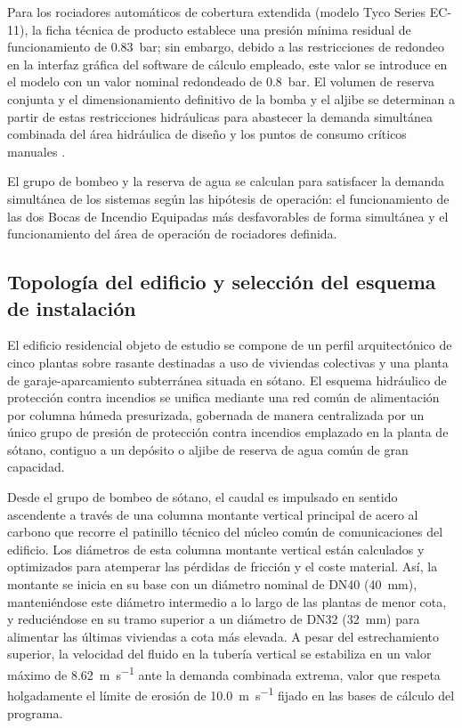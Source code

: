 \documentclass[12pt,a4paper]{article}
\begin{document}
Para los rociadores automáticos de cobertura extendida (modelo Tyco Series EC-11), la ficha técnica de producto establece una presión mínima residual de funcionamiento de \SI{0.83}{\bar}; sin embargo, debido a las restricciones de redondeo en la interfaz gráfica del software de cálculo empleado, este valor se introduce en el modelo con un valor nominal redondeado de \SI{0.8}{\bar}. El volumen de reserva conjunta y el dimensionamiento definitivo de la bomba y el aljibe se determinan a partir de estas restricciones hidráulicas para abastecer la demanda simultánea combinada del área hidráulica de diseño y los puntos de consumo críticos manuales \parencite{TYCO_EC11,UNE_EN_12845}.

El grupo de bombeo y la reserva de agua se calculan para satisfacer la demanda simultánea de los sistemas según las hipótesis de operación: el funcionamiento de las dos Bocas de Incendio Equipadas más desfavorables de forma simultánea y el funcionamiento del área de operación de rociadores definida.

\subsection{Topología del edificio y selección del esquema de instalación}

El edificio residencial objeto de estudio se compone de un perfil arquitectónico de cinco plantas sobre rasante destinadas a uso de viviendas colectivas y una planta de garaje-aparcamiento subterránea situada en sótano. El esquema hidráulico de protección contra incendios se unifica mediante una red común de alimentación por columna húmeda presurizada, gobernada de manera centralizada por un único grupo de presión de protección contra incendios emplazado en la planta de sótano, contiguo a un depósito o aljibe de reserva de agua común de gran capacidad.

Desde el grupo de bombeo de sótano, el caudal es impulsado en sentido ascendente a través de una columna montante vertical principal de acero al carbono que recorre el patinillo técnico del núcleo común de comunicaciones del edificio. Los diámetros de esta columna montante vertical están calculados y optimizados para atemperar las pérdidas de fricción y el coste material. Así, la montante se inicia en su base con un diámetro nominal de DN40 (\SI{40}{\milli\meter}), manteniéndose este diámetro intermedio a lo largo de las plantas de menor cota, y reduciéndose en su tramo superior a un diámetro de DN32 (\SI{32}{\milli\meter}) para alimentar las últimas viviendas a cota más elevada. A pesar del estrechamiento superior, la velocidad del fluido en la tubería vertical se estabiliza en un valor máximo de \SI{8.62}{\meter\per\second} ante la demanda combinada extrema, valor que respeta holgadamente el límite de erosión de \SI{10.0}{\meter\per\second} fijado en las bases de cálculo del programa.
\end{document}
